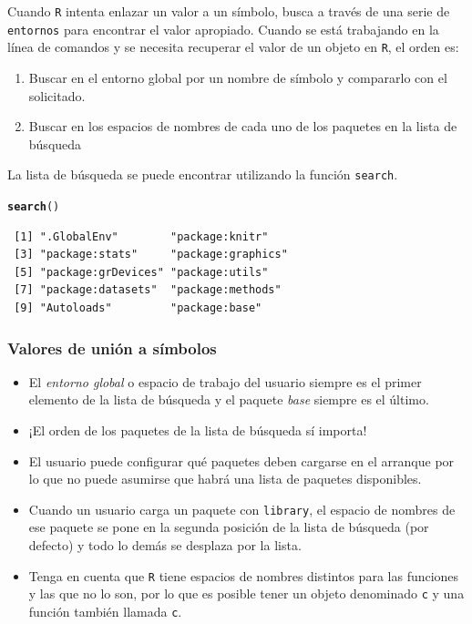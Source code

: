 \documentclass{article}\usepackage[]{graphicx}\usepackage[]{color}
\makeatletter
\newcommand{\hlstd}[1]{\textcolor[rgb]{0.345,0.345,0.345}{#1}}%
\newcommand{\hlkwd}[1]{\textcolor[rgb]{0.737,0.353,0.396}{\textbf{#1}}}%
\newenvironment{kframe}{%
 \def\at@end@of@kframe{}%
 \ifinner\ifhmode%
  \def\at@end@of@kframe{\end{minipage}}%
  \begin{minipage}{\columnwidth}%
 \fi\fi%
 \def\FrameCommand##1{\hskip\@totalleftmargin \hskip-\fboxsep
 \colorbox{shadecolor}{##1}\hskip-\fboxsep
     \hskip-\linewidth \hskip-\@totalleftmargin \hskip\columnwidth}%
 \MakeFramed {\advance\hsize-\width
   \@totalleftmargin\z@ \linewidth\hsize
   \@setminipage}}%
 {\par\unskip\endMakeFramed%
 \at@end@of@kframe}
\newenvironment{knitrout}{}{} %
\makeatother
\begin{document}
    Cuando \texttt{R} intenta enlazar un valor a un símbolo, busca a través de una serie de \texttt{entornos} para encontrar el valor apropiado. Cuando se está trabajando en la línea de comandos y se necesita recuperar el valor de un objeto en \texttt{R}, el orden es:

    \begin{enumerate}
      \item Buscar en el entorno global por un nombre de símbolo y compararlo con el solicitado.
      \item Buscar en los espacios de nombres de cada uno de los paquetes en la lista de búsqueda
    \end{enumerate}

    La lista de búsqueda se puede encontrar utilizando la función \texttt{search}.
\begin{knitrout}
\color{fgcolor}\begin{kframe}
\begin{alltt}
  \hlkwd{search}\hlstd{()}
\end{alltt}
\begin{verbatim}
 [1] ".GlobalEnv"        "package:knitr"    
 [3] "package:stats"     "package:graphics" 
 [5] "package:grDevices" "package:utils"    
 [7] "package:datasets"  "package:methods"  
 [9] "Autoloads"         "package:base"     
\end{verbatim}
\end{kframe}
\end{knitrout}
    
    \subsubsection{Valores de unión a símbolos}
    \begin{itemize}
      \item El \emph{entorno global} o espacio de trabajo del usuario siempre es el primer elemento de la lista de búsqueda y el paquete \emph{base} siempre es el último.
      \item ¡El orden de los paquetes de la lista de búsqueda sí importa!
      \item El usuario puede configurar qué paquetes deben cargarse en el arranque por lo que no puede asumirse que habrá una lista de paquetes disponibles.
      \item Cuando un usuario carga un paquete con \texttt{library}, el espacio de nombres de ese paquete se pone en la segunda posición de la lista de búsqueda (por defecto) y todo lo demás se desplaza por la lista.
      \item Tenga en cuenta que \texttt{R} tiene espacios de nombres distintos para las funciones y las que no lo son, por lo que es posible tener un objeto denominado \texttt{c} y una función también llamada \texttt{c}. 
    \end{itemize}
\end{document}
